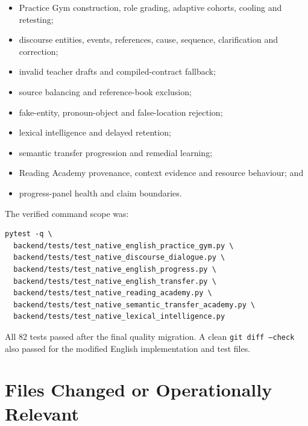 \documentclass[11pt,a4paper]{article}
\begin{document}
\begin{itemize}
  \item Practice Gym construction, role grading, adaptive cohorts, cooling and retesting;
  \item discourse entities, events, references, cause, sequence, clarification and correction;
  \item invalid teacher drafts and compiled-contract fallback;
  \item source balancing and reference-book exclusion;
  \item fake-entity, pronoun-object and false-location rejection;
  \item lexical intelligence and delayed retention;
  \item semantic transfer progression and remedial learning;
  \item Reading Academy provenance, context evidence and resource behaviour; and
  \item progress-panel health and claim boundaries.
\end{itemize}

The verified command scope was:

\begin{lstlisting}
pytest -q \
  backend/tests/test_native_english_practice_gym.py \
  backend/tests/test_native_discourse_dialogue.py \
  backend/tests/test_native_english_progress.py \
  backend/tests/test_native_english_transfer.py \
  backend/tests/test_native_reading_academy.py \
  backend/tests/test_native_semantic_transfer_academy.py \
  backend/tests/test_native_lexical_intelligence.py
\end{lstlisting}

All 82 tests passed after the final quality migration. A clean \texttt{git diff --check} also
passed for the modified English implementation and test files.

\section{Files Changed or Operationally Relevant}
\end{document}
